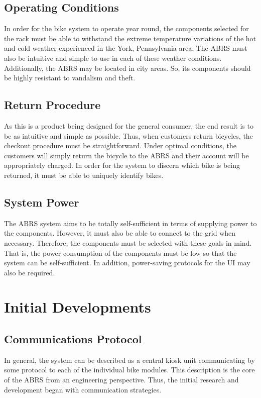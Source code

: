 \documentclass[11pt,a4paper,onesides]{report}
\begin{document}
\section{Operating Conditions}

In order for the bike system to operate year round, the components selected for the rack must be able to withstand the extreme temperature variations of the hot and cold weather experienced in the York, Pennsylvania area.  The ABRS must also be intuitive and simple to use in each of these weather conditions.  Additionally, the ABRS may be located in city areas.  So, its components should be highly resistant to vandalism and theft. 

\section{Return Procedure}

As this is a product being designed for the general consumer, the end result is to be as intuitive and simple as possible.  Thus, when customers return bicycles, the checkout procedure must be straightforward.  Under optimal conditions, the customers will simply return the bicycle to the ABRS and their account will be appropriately charged.  In order for the system to discern which bike is being returned, it must be able to uniquely identify bikes.

\section{System Power}

 The ABRS system aims to be totally self-sufficient in terms of supplying power to the components.  However, it must also be able to connect to the grid when necessary.  Therefore, the components must be selected with these goals in mind.  That is, the power consumption of the components must be low so that the system can be self-sufficient.  In addition, power-saving protocols for the UI may also be required.  

\chapter{Initial Developments}

\section{Communications Protocol}

In general, the system can be described as a central kiosk unit communicating by some protocol to each of the individual bike modules.  This description is the core of the ABRS from an engineering perspective.  Thus, the initial research and development began with communication strategies.  
\end{document}
